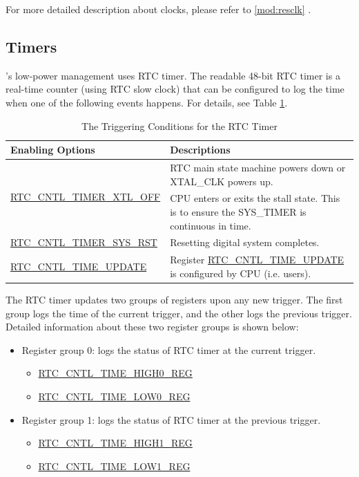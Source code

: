 \documentclass[main\_\_EN.tex]{subfiles}
\begin{document}
For more detailed description about clocks, please refer to \ref{mod:resclk} \textit{}.

\subsection{Timers}

\chipname{}'s low-power management uses RTC timer. The readable 48-bit RTC timer is a real-time counter (using RTC slow clock) that can be configured to log the time when one of the following events happens. For details, see Table \ref{tab:lpm-Update-RTC-TIMER-VALUE}.

\begin{longtable}[c]{|p{5.5cm}|p{9cm}|}
    \caption{The Triggering Conditions for the RTC Timer} \label{tab:lpm-Update-RTC-TIMER-VALUE}
    \\\hline
    \rowcolor{lightgray}
    \textbf{Enabling Options} & \textbf{Descriptions} \\
    \hline
    \multirow{2}{*}{\hyperref[regdesc:RTCCNTLTIMEUPDATEREG]{RTC\_CNTL\_TIMER\_XTL\_OFF}} & RTC main state machine powers down or XTAL\_CLK powers up.\\
    \hline
    \multirow{2}{*}{\hyperref[regdesc:RTCCNTLTIMEUPDATEREG]{RTC\_CNTL\_TIMER\_SYS\_STALL}} & CPU enters or exits the stall state. This is to ensure the SYS\_TIMER is continuous in time. \\
    \hline
    \hyperref[regdesc:RTCCNTLTIMEUPDATEREG]{RTC\_CNTL\_TIMER\_SYS\_RST} & Resetting digital system completes.\\
    \hline
    \multirow{2}{*}{\hyperref[regdesc:RTCCNTLTIMEUPDATEREG]{RTC\_CNTL\_TIME\_UPDATE}} & Register \hyperref[fielddesc:RTCCNTLTIMEUPDATE]{RTC\_CNTL\_TIME\_UPDATE} is configured by CPU (i.e. users).\\
    \hline
\end{longtable}


The RTC timer updates two groups of registers upon any new trigger. The first group logs the time of the current trigger, and the other logs the previous trigger. Detailed information about these two register groups is shown below:

\begin{itemize}
    \item Register group 0: logs the status of RTC timer at the current trigger.
    \begin{itemize}
        \item \hyperref[regdesc:RTCCNTLTIMEHIGH0REG]{RTC\_CNTL\_TIME\_HIGH0\_REG}
        \item \hyperref[regdesc:RTCCNTLTIMELOW0REG]{RTC\_CNTL\_TIME\_LOW0\_REG}
    \end{itemize}
    \item Register group 1: logs the status of RTC timer at the previous trigger.
    \begin{itemize}
    \item \hyperref[regdesc:RTCCNTLTIMEHIGH1REG]{RTC\_CNTL\_TIME\_HIGH1\_REG}
    \item \hyperref[regdesc:RTCCNTLTIMELOW1REG]{RTC\_CNTL\_TIME\_LOW1\_REG}
    \end{itemize}
\end{itemize}
\end{document}
